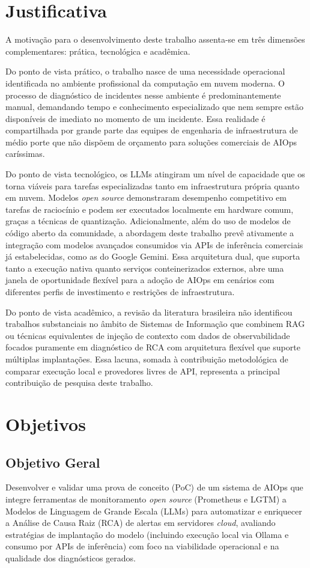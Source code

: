 \section{Justificativa}
A motivação para o desenvolvimento deste trabalho assenta-se em três dimensões complementares: prática, tecnológica e acadêmica.

Do ponto de vista prático, o trabalho nasce de uma necessidade operacional identificada no ambiente profissional da computação em nuvem moderna. O processo de diagnóstico de incidentes nesse ambiente é predominantemente manual, demandando tempo e conhecimento especializado que nem sempre estão disponíveis de imediato no momento de um incidente. Essa realidade é compartilhada por grande parte das equipes de engenharia de infraestrutura de médio porte que não dispõem de orçamento para soluções comerciais de AIOps caríssimas.

Do ponto de vista tecnológico, os LLMs atingiram um nível de capacidade que os torna viáveis para tarefas especializadas tanto em infraestrutura própria quanto em nuvem. Modelos \emph{open source} demonstraram desempenho competitivo em tarefas de raciocínio \cite{survey_llm_aiops_2024} e podem ser executados localmente em hardware comum, graças a técnicas de quantização. Adicionalmente, além do uso de modelos de código aberto da comunidade, a abordagem deste trabalho prevê ativamente a integração com modelos avançados consumidos via APIs de inferência comerciais já estabelecidas, como as do Google Gemini. Essa arquitetura dual, que suporta tanto a execução nativa quanto serviços conteinerizados externos, abre uma janela de oportunidade flexível para a adoção de AIOps em cenários com diferentes perfis de investimento e restrições de infraestrutura.

Do ponto de vista acadêmico, a revisão da literatura brasileira não identificou trabalhos substanciais no âmbito de Sistemas de Informação que combinem RAG ou técnicas equivalentes de injeção de contexto com dados de observabilidade focados puramente em diagnóstico de RCA com arquitetura flexível que suporte múltiplas implantações. Essa lacuna, somada à contribuição metodológica de comparar execução local e provedores livres de API, representa a principal contribuição de pesquisa deste trabalho.

\section{Objetivos}

\subsection{Objetivo Geral}
Desenvolver e validar uma prova de conceito (PoC) de um sistema de AIOps que integre ferramentas de monitoramento \emph{open source} (Prometheus e LGTM) a Modelos de Linguagem de Grande Escala (LLMs) para automatizar e enriquecer a Análise de Causa Raiz (RCA) de alertas em servidores \emph{cloud}, avaliando estratégias de implantação do modelo (incluindo execução local via Ollama e consumo por APIs de inferência) com foco na viabilidade operacional e na qualidade dos diagnósticos gerados.

